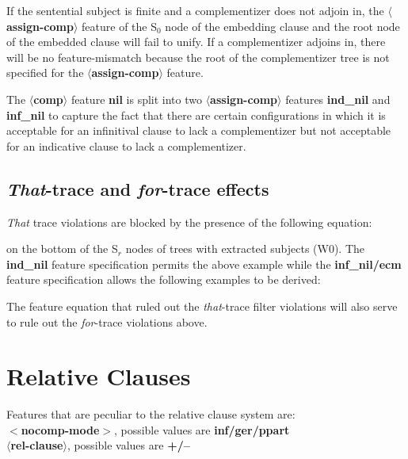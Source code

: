 If the sentential subject is finite and a complementizer does
not adjoin in, the {\bf $\langle$assign-comp$\rangle$} feature of the 
S$_{0}$ node of the embedding clause and the root node of the
embedded clause will fail to unify. If a complementizer adjoins in,
there will be no feature-mismatch because the root of the
complementizer tree is not specified for the {\bf $\langle$assign-comp$\rangle$} feature.

The {\bf $\langle$comp$\rangle$} feature {\bf nil} is split into two
{\bf $\langle$assign-comp$\rangle$} features {\bf ind\_nil} and
{\bf inf\_nil} to capture the fact that there are certain configurations in
which it is acceptable for an infinitival clause to lack a complementizer
but not acceptable for an indicative clause to lack a complementizer. 

\subsection{{\em That}-trace and {\em for}-trace effects}


{\em That} trace violations are blocked by the presence of the following
equation:


on the bottom of the S$_{r}$ nodes of trees with extracted subjects (W0). 
The {\bf ind\_nil} feature specification permits the above example
while the {\bf inf\_nil/ecm} feature specification allows the
following examples to be derived:


The feature equation that ruled out the {\em that}-trace filter violations
will also serve to rule out the {\em for}-trace violations above.

\section{Relative Clauses}
Features that are peculiar to the relative clause system are:\\
{\bf $<$nocomp-mode$>$}, possible values are {\bf inf/ger/ppart}\\
{\bf $\langle$rel-clause$\rangle$}, possible values are {\bf +/--}

